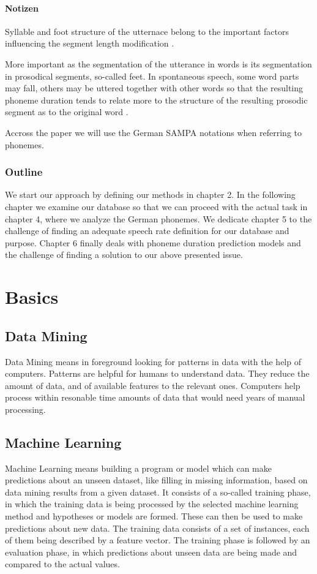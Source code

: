 \documentclass[a4paper]{scrreprt}
\begin{document}
\subsubsection*{Notizen}
Syllable and foot structure of the utternace belong to the important factors influencing the segment length modification  \cite{Hoequist1986}.

More important as the segmentation of the utterance in words is its segmentation in prosodical segments, so-called feet. In spontaneous speech, some word parts may fall, others may be uttered together with other words so that the resulting phoneme duration tends to relate more to the structure of the resulting prosodic segment as to the original word \cite{Kohler1986}. 

Accross the paper we will use the German SAMPA notations when referring to phonemes.

\subsection*{Outline}
We start our approach by defining our methods in chapter 2. In the following chapter we examine our database so that we can proceed with the actual task in chapter 4, where we analyze the German phonemes. We dedicate chapter 5 to the challenge of finding an adequate speech rate definition for our database and purpose. Chapter 6 finally deals with phoneme duration prediction models and the challenge of finding a solution to our above presented issue.

\chapter{Basics}
\section{Data Mining}
Data Mining means in foreground looking for patterns in data with the help of computers. Patterns are helpful for humans to understand data. They reduce the amount of data, and of available features to the relevant ones. Computers help process within resonable time amounts of data that would need years of manual processing.

\section{Machine Learning}
Machine Learning means building a program or model which can make predictions about an unseen dataset, like filling in missing information, based on data mining results from a given dataset. It consists of a so-called training phase, in which the training data is being processed by the selected machine learning method and hypotheses or models are formed. These can then be used to make predictions about new data. The training data consists of a set of instances, each of them being described by a feature vector. The training phase is followed by an evaluation phase, in which predictions about unseen data are being made and compared to the actual values. 
\end{document}
